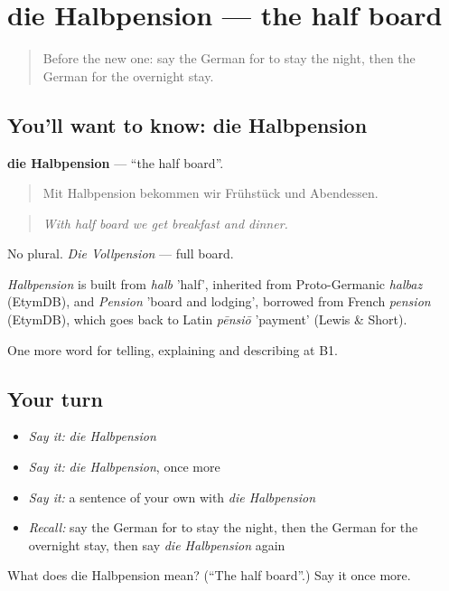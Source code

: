 \section[die Halbpension]{die Halbpension — the half board}

\label{lesson:GE-C424-halbpension}



\begin{quote}
Before the new one: say the German for to stay the night, then the German for the overnight stay.
\end{quote}

\subsection*{You'll want to know: die Halbpension}
\textbf{die Halbpension} — \textquotedblleft{}the half board\textquotedblright{}.

\begin{quote}
Mit Halbpension bekommen wir Frühstück und Abendessen.
\end{quote}

\begin{quote}
\emph{With half board we get breakfast and dinner.}
\end{quote}

No plural. \emph{Die Vollpension} — full board.

\begin{cousinweb}
\emph{Halbpension} is built from \emph{halb} 'half', inherited from Proto-Germanic \emph{halbaz} (EtymDB), and \emph{Pension} 'board and lodging', borrowed from French \emph{pension} (EtymDB), which goes back to Latin \emph{pēnsiō} 'payment' (Lewis \& Short).
\end{cousinweb}

\begin{grammarlens}[title={What you've built}]
One more word for telling, explaining and describing at B1.
\end{grammarlens}

\subsection*{Your turn}
\begin{itemize}
\raggedright
  \item \emph{Say it:} \emph{die Halbpension}
  \item \emph{Say it:} \emph{die Halbpension}, once more
  \item \emph{Say it:} a sentence of your own with \emph{die Halbpension}
  \item \emph{Recall:} say the German for to stay the night, then the German for the overnight stay, then say \emph{die Halbpension} again
\end{itemize}

\begin{tcolorbox}[breakable,colback=teal!4,colframe=teal!35!black,title={Before you move on}]
What does die Halbpension mean? (\textquotedblleft{}The half board\textquotedblright{}.) Say it once more.
\end{tcolorbox}

